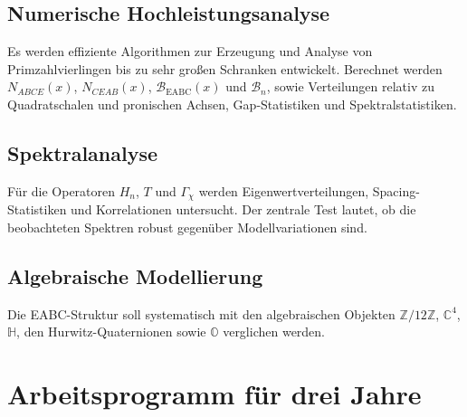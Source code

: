 \documentclass[11pt,a4paper,bibliography=totoc]{scrartcl}
\begin{document}
\subsection{Numerische Hochleistungsanalyse}
Es werden effiziente Algorithmen zur Erzeugung und Analyse von Primzahlvierlingen bis zu sehr großen Schranken entwickelt. Berechnet werden $N_{ABCE}(x)$, $N_{CEAB}(x)$, $\mathcal{B}_{\mathrm{EABC}}(x)$ und $\mathcal{B}_n$, sowie Verteilungen relativ zu Quadratschalen und pronischen Achsen, Gap-Statistiken und Spektralstatistiken.

\subsection{Spektralanalyse}
Für die Operatoren $H_n$, $T$ und $\Gamma_\chi$ werden Eigenwertverteilungen, Spacing-Statistiken und Korrelationen untersucht. Der zentrale Test lautet, ob die beobachteten Spektren robust gegenüber Modellvariationen sind.

\subsection{Algebraische Modellierung}
Die EABC-Struktur soll systematisch mit den algebraischen Objekten $\mathbb{Z}/12\mathbb{Z}$, $\mathbb{C}^4$, $\mathbb{H}$, den Hurwitz-Quaternionen sowie $\mathbb{O}$ verglichen werden.

\section{Arbeitsprogramm für drei Jahre}
\end{document}
